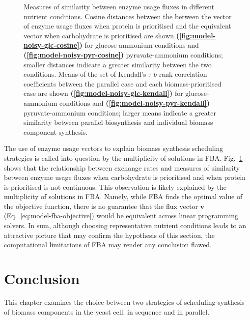 \begin{figure}
  \caption{
    Measures of similarity between enzyme usage fluxes in different nutrient conditions.
    Cosine distances between the between the vector of enzyme usage fluxes when protein is prioritised and the equivalent vector when carbohydrate is prioritised are shown \textbf{(\ref{fig:model-noisy-glc-cosine})} for glucose-ammonium conditions and \textbf{(\ref{fig:model-noisy-pyr-cosine})} pyruvate-ammonium conditions; smaller distances indicate a greater similarity between the two conditions.
    Means of the set of Kendall's $\tau$-$b$ rank correlation coefficients between the parallel case and each biomass-prioritised case are shown \textbf{(\ref{fig:model-noisy-glc-kendall})} for glucose-ammonium conditions and \textbf{(\ref{fig:model-noisy-pyr-kendall})} pyruvate-ammonium conditions; larger means indicate a greater similarity between parallel biosynthesis and individual biomass component synthesis.
    }
  \label{fig:model-noisy}
\end{figure}

The use of enzyme usage vectors to explain biomass synthesis scheduling strategies is called into question by the multiplicity of solutions in FBA.
Fig.\ \ref{fig:model-noisy} shows that the relationship between exchange rates and measures of similarity between enzyme usage fluxes when carbohydrate is prioritised and when protein is prioritised is not continuous.
This observation is likely explained by the multiplicity of solutions in FBA.
Namely, while FBA finds the optimal value of the objective function, there is no guarantee that the flux vector $\mathbf{v}$ (Eq.\ \ref{eq:model-fba-objective}) would be equivalent across linear programming solvers.
In sum, although choosing representative nutrient conditions leads to an attractive picture that may confirm the hypothesis of this section, the computational limitations of FBA may render any conclusion flawed.


\section{Conclusion}
\label{subsec:model-conclusion}

This chapter examines the choice between two strategies of scheduling synthesis of biomass components in the yeast cell: in sequence and in parallel.

